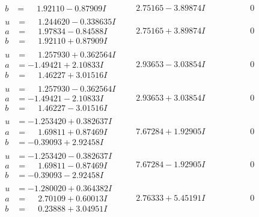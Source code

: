 \documentclass[1p]{elsarticle_modified}
\theoremstyle{definition}
\begin{document}
$$\begin{array}{c|c|c}
\begin{aligned}
b &= \phantom{-}1.92110 - 0.87909 I\end{aligned}
 & \phantom{-}2.75165 - 3.89874 I & \phantom{-0.000000 } 0 \\ \hline\begin{aligned}
u &= \phantom{-}1.244620 - 0.338635 I \\
a &= \phantom{-}1.97834 - 0.84588 I \\
b &= \phantom{-}1.92110 + 0.87909 I\end{aligned}
 & \phantom{-}2.75165 + 3.89874 I & \phantom{-0.000000 } 0 \\ \hline\begin{aligned}
u &= \phantom{-}1.257930 + 0.362564 I \\
a &= -1.49421 + 2.10833 I \\
b &= \phantom{-}1.46227 + 3.01516 I\end{aligned}
 & \phantom{-}2.93653 - 3.03854 I & \phantom{-0.000000 } 0 \\ \hline\begin{aligned}
u &= \phantom{-}1.257930 - 0.362564 I \\
a &= -1.49421 - 2.10833 I \\
b &= \phantom{-}1.46227 - 3.01516 I\end{aligned}
 & \phantom{-}2.93653 + 3.03854 I & \phantom{-0.000000 } 0 \\ \hline\begin{aligned}
u &= -1.253420 + 0.382637 I \\
a &= \phantom{-}1.69811 + 0.87469 I \\
b &= -0.39093 + 2.92458 I\end{aligned}
 & \phantom{-}7.67284 + 1.92905 I & \phantom{-0.000000 } 0 \\ \hline\begin{aligned}
u &= -1.253420 - 0.382637 I \\
a &= \phantom{-}1.69811 - 0.87469 I \\
b &= -0.39093 - 2.92458 I\end{aligned}
 & \phantom{-}7.67284 - 1.92905 I & \phantom{-0.000000 } 0 \\ \hline\begin{aligned}
u &= -1.280020 + 0.364382 I \\
a &= \phantom{-}2.70109 + 0.60013 I \\
b &= \phantom{-}0.23888 + 3.04951 I\end{aligned}
 & \phantom{-}2.76333 + 5.45191 I & \phantom{-0.000000 } 0 \\ \hline\begin{aligned}

\end{aligned}
\end{array}$$
\end{document}
